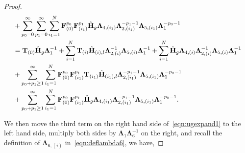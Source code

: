 \documentclass[twoside,11pt]{article}
\newcommand{\matF}{\mathbf{F}}
\newcommand{\hmatH}{{\hat{\mathbf{H}}}{}}
\newcommand{\matT}{\mathbf{T}}
\newcommand{\matLambda}{\mathbf{\Lambda}}
\begin{document}
\begin{proof}
\begin{align}
&+\sum_{p_0=0}^{\infty}\sum_{p_1=0}^{\infty}\sum_{i_1=1}^N\matF_{(0)}^{p_0}\matF_{(i_1)}^{p_1}\hmatH_{g}\matLambda_{4,(i_1)}\matLambda_{2,(i_1)}^{-p_1-1}\matLambda_{5,(i_1)}\matLambda_{1}^{-p_0-1}\notag\\
&= \matT_{(0)}\hmatH_g\matLambda_1^{-1} +\sum_{i=1}^N\matT_{(i)}\hmatH_{(i),l}\matLambda_{2,(i)}^{-1}\matLambda_{5,(i)}\matLambda_{1}^{-1}+\sum_{i=1}^N\hmatH_{g}\matLambda_{4,(i)}\matLambda_{2,(i)}^{-1}\matLambda_{5,(i)}\matLambda_{1}^{-1} \notag\\
&+\sum_{p_0+p_1\ge 1}^{\infty}\sum_{i_1=1}^N\matF_{(0)}^{p_0}\matF_{(i_1)}^{p_1}\matT_{(i_1)}\hmatH_{(i_1),l}\matLambda_{2,(i_1)}^{-p_1-1}\matLambda_{5,(i_1)}\matLambda_{1}^{-p_0-1}\notag\\
&+\sum_{p_0+p_1\ge 1}^{\infty}\sum_{i_1=1}^N\matF_{(0)}^{p_0}\matF_{(i_1)}^{p_1}\hmatH_{g}\matLambda_{4,(i_1)}\matLambda_{2,(i_1)}^{-p_1-1}\matLambda_{5,(i_1)}\matLambda_{1}^{-p_0-1}.\notag\\
\label{eqn:ugexpand1}
\end{align}

We then move the third term on the right hand side of~\eqref{eqn:ugexpand1} to the left hand side, multiply both sides by $\matLambda_1\matLambda_{6}^{-1}$ on the right, and recall the definition of $\matLambda_{6,(i)}$ in~\eqref{eqn:deflambda6}, we have,


\end{proof}
\end{document}
